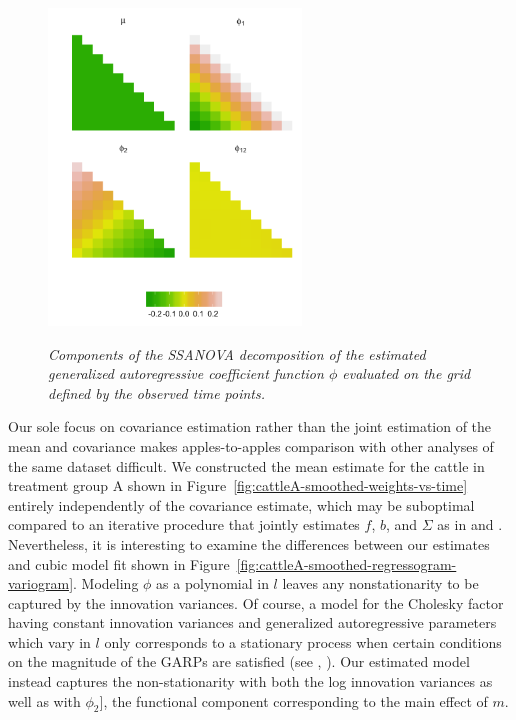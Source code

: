 %
\begin{figure}[H] 
\centering
\caption{\textit{Components of the SSANOVA decomposition of the estimated generalized autoregressive coefficient function $\phi$ evaluated on the grid defined by the observed time points.}}
  \includegraphics[width = 0.6\textwidth]{img/chapter-5/cattle-ssanova-estimate-lattice} \label{fig:cattle-fitted-cholesky-ssanova}
\end{figure}


Our sole focus on covariance estimation rather than the joint estimation of the mean and covariance makes apples-to-apples comparison with other analyses of the same dataset difficult. We constructed the mean estimate for the cattle in treatment group A shown in Figure~\ref{fig:cattleA-smoothed-weights-vs-time} entirely independently of the covariance estimate, which may be suboptimal compared to an iterative procedure that jointly estimates $f$, $b$, and $\Sigma$ as in \cite{pan2017jmcm} and \cite{pourahmadi1999joint}. Nevertheless, it is interesting to examine the differences between our estimates and cubic model fit shown in Figure~\ref{fig:cattleA-smoothed-regressogram-variogram}. Modeling $\phi$ as a polynomial in $l$ leaves any nonstationarity to be captured by the innovation variances. Of course, a model for the Cholesky factor having constant innovation variances and generalized autoregressive parameters which vary in $l$ only corresponds to a stationary process when certain conditions on the magnitude of the GARPs are satisfied (see \citep{klein1997statistical}, \citep{madsen2007time}). Our estimated model instead captures the non-stationarity with both the log innovation variances as well as with $\phi_2]$, the functional component corresponding to the main effect of $m$.



%
%
%
